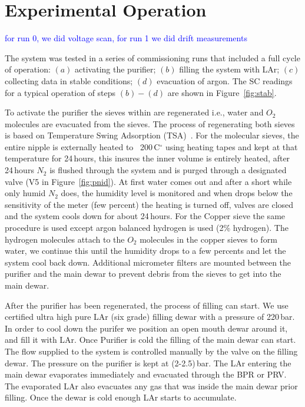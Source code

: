\documentclass[a4paper,12pt]{article}
\newcommand{\RI}[1]{\textcolor{blue}{#1}}
\begin{document}
\section{Experimental Operation}
\label{sec:ExpOp}

\RI{for run 0, we did voltage scan, for run 1 we did drift measurements}

The system was tested  in a series of commissioning runs that included a full cycle of operation: $(a)$ activating the purifier;  $(b)$ filling the system with LAr; $(c)$ collecting data in stable conditions; $(d)$ evacuation of argon. The SC readings for a typical operation of steps $(b) - (d)$ are shown in Figure~\ref{fig:stab}.

To activate the purifier the sieves within are regenerated i.e., water and $O_2$ molecules are evacuated from the sieves. The process of regenerating both sieves is based on Temperature Swing Adsorption (TSA)~\cite{LeVan1989}. For the molecular sieves, the entire nipple is externally heated to ~200\,C$^{\circ}$ using heating tapes and kept at that temperature for 24\,hours, this insures the inner volume is entirely heated, after 24\,hours $N_2$ is flushed through the system and is purged through a designated valve (V5 in Figure~\ref{fig:pnid}). At first water comes out and after a short while only humid $N_2$ does, the humidity level is monitored and when drops below the sensitivity of the meter (few percent) the heating is turned off, valves are closed and the system cools down for about 24\,hours. For the Copper sieve the same procedure is used except argon balanced hydrogen is used (2\% hydrogen). The hydrogen molecules attach to the $O_2$ molecules in the copper sieves to form water, we continue this until the humidity drops to a few percents and let the system cool back down. Additional micrometer filters are mounted between the purifier and the main dewar to prevent debris from the sieves to get into the main dewar.

After the purifier has been regenerated, the process of filling can start. We use certified ultra high pure LAr (six grade) filling dewar with a pressure of 220\,bar. In order to cool down the purifer we position an open mouth dewar around it, and fill it with LAr. Once Purifier is cold the filling of the main dewar can start. The flow supplied to the system is controlled manually by the valve on the filling dewar. The pressure on the purifier is kept at (2-2.5)\,bar. The LAr entering the main dewar evaporates immediately and evacuated through the BPR or PRV. The evaporated LAr also evacuates any gas that was inside the main dewar prior filling. Once the dewar is cold enough LAr starts to accumulate.
\end{document}
